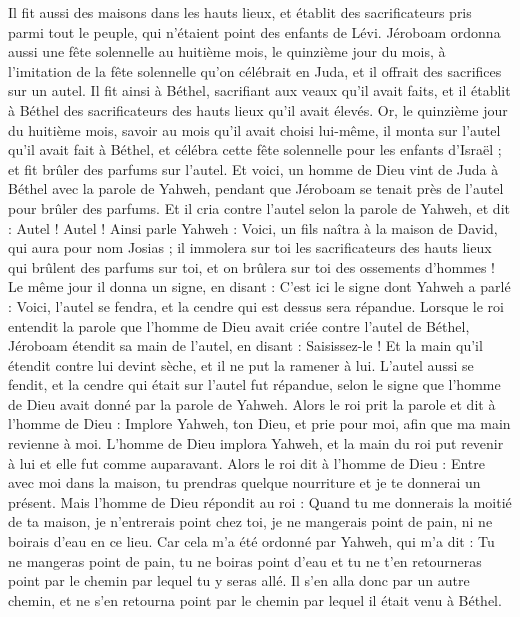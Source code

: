 \begin{multicols}{2}
Il fit aussi des maisons dans les hauts lieux, et établit des sacrificateurs pris parmi tout le peuple, qui n'étaient point des enfants de Lévi.
Jéroboam ordonna aussi une fête solennelle au huitième mois, le quinzième jour du mois, à l'imitation de la fête solennelle qu'on célébrait en Juda, et il offrait des sacrifices sur un autel. Il fit ainsi à Béthel, sacrifiant aux veaux qu'il avait faits, et il établit à Béthel des sacrificateurs des hauts lieux qu'il avait élevés.
Or, le quinzième jour du huitième mois, savoir au mois qu'il avait choisi lui-même, il monta sur l'autel qu'il avait fait à Béthel, et célébra cette fête solennelle pour les enfants d'Israël ; et fit brûler des parfums sur l'autel.
\VerseOne{}Et voici, un homme de Dieu vint de Juda à Béthel avec la parole de Yahweh, pendant que Jéroboam se tenait près de l'autel pour brûler des parfums.
Et il cria contre l'autel selon la parole de Yahweh, et dit : Autel ! Autel ! Ainsi parle Yahweh : Voici, un fils naîtra à la maison de David, qui aura pour nom Josias ; il immolera sur toi les sacrificateurs des hauts lieux qui brûlent des parfums sur toi, et on brûlera sur toi des ossements d’hommes !
Le même jour il donna un signe, en disant : C'est ici le signe dont Yahweh a parlé : Voici, l'autel se fendra, et la cendre qui est dessus sera répandue.
Lorsque le roi entendit la parole que l'homme de Dieu avait criée contre l'autel de Béthel, Jéroboam étendit sa main de l'autel, en disant : Saisissez-le ! Et la main qu'il étendit contre lui devint sèche, et il ne put la ramener à lui.
L'autel aussi se fendit, et la cendre qui était sur l'autel fut répandue, selon le signe que l'homme de Dieu avait donné par la parole de Yahweh.
Alors le roi prit la parole et dit à l'homme de Dieu : Implore Yahweh, ton Dieu, et prie pour moi, afin que ma main revienne à moi. L'homme de Dieu implora Yahweh, et la main du roi put revenir à lui et elle fut comme auparavant.
Alors le roi dit à l'homme de Dieu : Entre avec moi dans la maison, tu prendras quelque nourriture et je te donnerai un présent.
Mais l'homme de Dieu répondit au roi : Quand tu me donnerais la moitié de ta maison, je n'entrerais point chez toi, je ne mangerais point de pain, ni ne boirais d'eau en ce lieu.
Car cela m'a été ordonné par Yahweh, qui m'a dit : Tu ne mangeras point de pain, tu ne boiras point d'eau et tu ne t'en retourneras point par le chemin par lequel tu y seras allé.
Il s'en alla donc par un autre chemin, et ne s'en retourna point par le chemin par lequel il était venu à Béthel.

\end{multicols}
